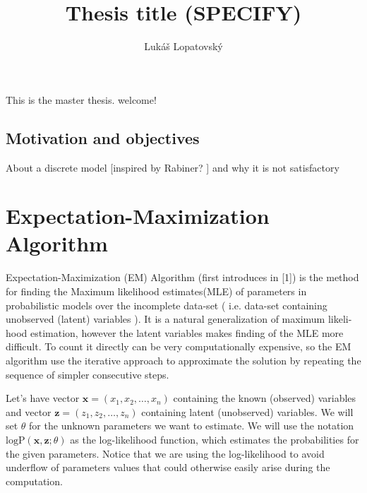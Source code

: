 \documentclass[thesis=M,english]{FITthesis}[2012/10/20]
\title{Thesis title (SPECIFY)}
\author{Luk{\' a}{\v s} Lopatovsk{\' y}} %
\begin{document}


\begin{introduction}
	This is the master thesis. welcome!
	\section{Motivation and objectives}
	About a discrete model [inspired by Rabiner? ] and why it is not satisfactory  %
\end{introduction}


\chapter{Expectation-Maximization Algorithm}\label{ch:EM}



Expectation-Maximization (EM) Algorithm (first introduces in [1]) is the method for finding the Maximum likelihood estimates(MLE) of parameters in probabilistic models over the incomplete data-set ( i.e. data-set containing unobserved (latent) variables ). It is a natural generalization of maximum likeli-
hood estimation, however the latent variables makes finding of the MLE more difficult. To count it directly can be very computationally expensive, so the EM algorithm use the iterative approach to approximate the solution by repeating the sequence of simpler consecutive steps.

Let's have vector $\mathbf{x} = (x_{1},x_{2},\dotsc,x_{n})$ containing the known (observed) variables and vector $\mathbf{z} = (z_{1},z_{2},\dotsc,z_{n})$ containing latent (unobserved) variables. We will set $\theta$ for the unknown parameters we want to estimate. We will use the notation $\mathrm{logP}(\mathbf{x},\mathbf{z};\theta)$ as the log-likelihood function, which estimates the probabilities for the given parameters. Notice that we are using the log-likelihood to avoid underflow of parameters values that could otherwise easily arise during the computation.  
\end{document}
